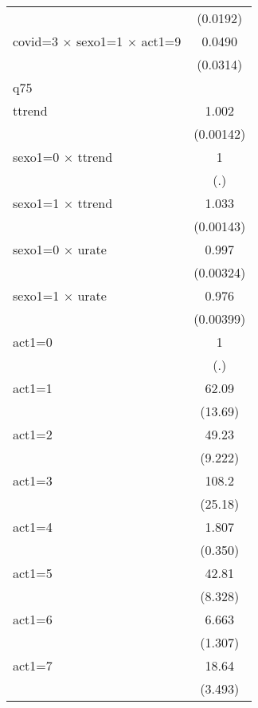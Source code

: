 {\begin{tabular}{l*{1}{c}}
                    &    (0.0192)         \\
[1em]
covid=3 $\times$ sexo1=1 $\times$ act1=9&      0.0490\sym{***}\\
                    &    (0.0314)         \\
\hline
q75                 &                     \\
ttrend              &       1.002         \\
                    &   (0.00142)         \\
[1em]
sexo1=0 $\times$ ttrend&           1         \\
                    &         (.)         \\
[1em]
sexo1=1 $\times$ ttrend&       1.033\sym{***}\\
                    &   (0.00143)         \\
[1em]
sexo1=0 $\times$ urate&       0.997         \\
                    &   (0.00324)         \\
[1em]
sexo1=1 $\times$ urate&       0.976\sym{***}\\
                    &   (0.00399)         \\
[1em]
act1=0              &           1         \\
                    &         (.)         \\
[1em]
act1=1              &       62.09\sym{***}\\
                    &     (13.69)         \\
[1em]
act1=2              &       49.23\sym{***}\\
                    &     (9.222)         \\
[1em]
act1=3              &       108.2\sym{***}\\
                    &     (25.18)         \\
[1em]
act1=4              &       1.807\sym{**} \\
                    &     (0.350)         \\
[1em]
act1=5              &       42.81\sym{***}\\
                    &     (8.328)         \\
[1em]
act1=6              &       6.663\sym{***}\\
                    &     (1.307)         \\
[1em]
act1=7              &       18.64\sym{***}\\
                    &     (3.493)         \\

\end{tabular}}
